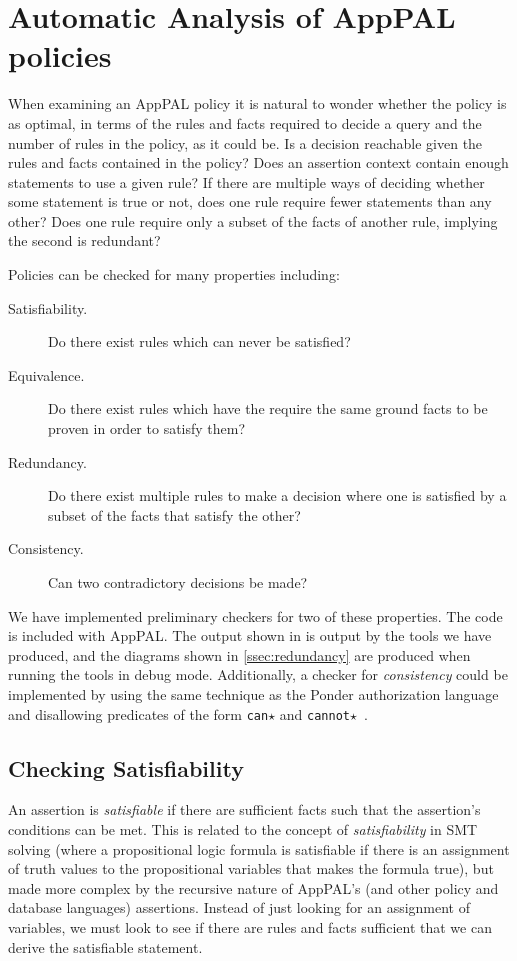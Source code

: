 \documentclass[thesis.tex]{subfiles}
\begin{document}
\section{Automatic Analysis of AppPAL policies}
\label{sec:lint}

When examining an AppPAL policy it is natural to wonder whether the
policy is as optimal, in terms of the rules and facts required to
decide a query and the number of rules in the policy, as it could
be. Is a decision reachable given the rules and facts contained in the
policy?  Does an assertion context contain enough statements to use a
given rule? If there are multiple ways of deciding whether some
statement is true or not, does one rule require fewer statements than
any other? Does one rule require only a subset of the facts of another
rule, implying the second is redundant?

Policies can be checked for many properties including:
\begin{description}
\item[Satisfiability.] Do there exist rules which can never be satisfied?
\item[Equivalence.] Do there exist rules which have the require the same ground facts to be proven in order to satisfy them?
\item[Redundancy.] Do there exist multiple rules to make a decision where one is satisfied by a subset of the facts that satisfy the other?
\item[Consistency.] Can two contradictory decisions be made?
\end{description}

We have implemented preliminary checkers for two of these properties. The code
is included with AppPAL. The output shown in  is
output by the tools we have produced, and the diagrams shown in
\autoref{ssec:redundancy} are produced when running the tools in debug mode.
Additionally, a checker for \emph{consistency} could be implemented by using the
same technique as the Ponder authorization language and disallowing predicates
of the form \texttt{can$\star$} and
\texttt{cannot$\star$}~\cite{damianou_ponder_2001}.


\subsection{Checking Satisfiability}
\label{ssec:checking-satisfiability}

An assertion is \emph{satisfiable} if there are sufficient facts
such that the assertion's conditions can be met.
%
This is related to the concept of \emph{satisfiability} in SMT solving (where a propositional logic formula is satisfiable if there is an assignment of truth values to the propositional variables that makes the formula true), but made more complex by the recursive nature of AppPAL's (and other policy and database languages) assertions. Instead of just looking for an assignment of variables, we must look to see if there are rules and facts sufficient that we can derive the satisfiable statement.
\end{document}
